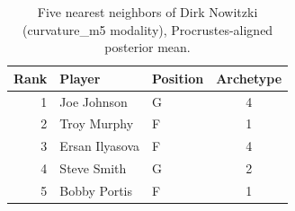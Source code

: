 \begin{table}[htbp]
  \centering\small
  \begin{tabular}{rllc}
    \toprule
    Rank & Player & Position & Archetype \\
    \midrule
    1 & Joe Johnson & G & 4 \\
    2 & Troy Murphy & F & 1 \\
    3 & Ersan Ilyasova & F & 4 \\
    4 & Steve Smith & G & 2 \\
    5 & Bobby Portis & F & 1 \\
    \bottomrule
  \end{tabular}
  \caption{Five nearest neighbors of Dirk Nowitzki (curvature_m5 modality), Procrustes-aligned posterior mean.}
  \label{tab:Dirk_Nowitzki_neighbors_curvature_m5}
\end{table}

